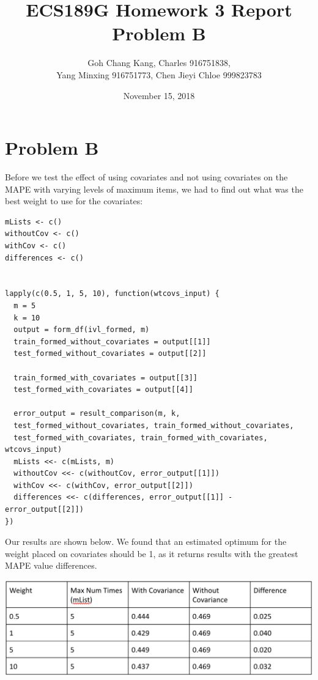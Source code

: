 \documentclass{article}
\begin{document}
\begin{titlepage}
\title{ECS189G Homework 3 Report Problem B}
\author{Goh Chang Kang, Charles 916751838, \\
Yang Minxing 916751773, Chen Jieyi Chloe 999823783}

\date{November 15, 2018}
\maketitle
\end{titlepage}


\section{Problem B}
Before we test the effect of using covariates and not using covariates on the MAPE with varying levels of maximum items, we had to find out what was the best weight to use for the covariates:
\begin{verbatim}
mLists <- c()
withoutCov <- c()
withCov <- c()
differences <- c()


lapply(c(0.5, 1, 5, 10), function(wtcovs_input) {
  m = 5
  k = 10
  output = form_df(ivl_formed, m)
  train_formed_without_covariates = output[[1]]
  test_formed_without_covariates = output[[2]]
  
  train_formed_with_covariates = output[[3]]
  test_formed_with_covariates = output[[4]]
  
  error_output = result_comparison(m, k, 
  test_formed_without_covariates, train_formed_without_covariates, 
  test_formed_with_covariates, train_formed_with_covariates, wtcovs_input)
  mLists <<- c(mLists, m)
  withoutCov <<- c(withoutCov, error_output[[1]])
  withCov <<- c(withCov, error_output[[2]])
  differences <<- c(differences, error_output[[1]] - error_output[[2]])
})

\end{verbatim}

Our results are shown below. We found that an estimated optimum for the weight placed on covariates should be 1, as it returns results with the greatest MAPE value differences.

\includegraphics[scale=0.5]{FindingCovariateWeights.png}
\end{document}

